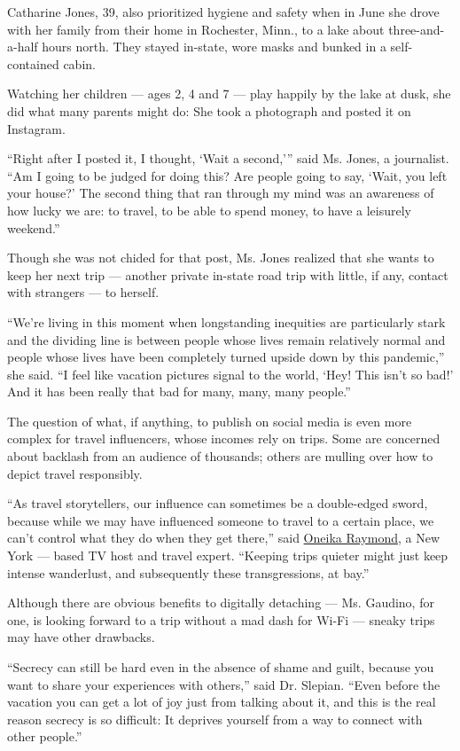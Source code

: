 Catharine Jones, 39, also prioritized hygiene and safety when in June
she drove with her family from their home in Rochester, Minn., to a lake
about three-and-a-half hours north. They stayed in-state, wore masks and
bunked in a self-contained cabin.

Watching her children --- ages 2, 4 and 7 --- play happily by the lake
at dusk, she did what many parents might do: She took a photograph and
posted it on Instagram.

``Right after I posted it, I thought, `Wait a second,''' said Ms. Jones,
a journalist. ``Am I going to be judged for doing this? Are people going
to say, `Wait, you left your house?' The second thing that ran through
my mind was an awareness of how lucky we are: to travel, to be able to
spend money, to have a leisurely weekend.''

Though she was not chided for that post, Ms. Jones realized that she
wants to keep her next trip --- another private in-state road trip with
little, if any, contact with strangers --- to herself.

``We're living in this moment when longstanding inequities are
particularly stark and the dividing line is between people whose lives
remain relatively normal and people whose lives have been completely
turned upside down by this pandemic,'' she said. ``I feel like vacation
pictures signal to the world, `Hey! This isn't so bad!' And it has been
really that bad for many, many, many people.''

The question of what, if anything, to publish on social media is even
more complex for travel influencers, whose incomes rely on trips. Some
are concerned about backlash from an audience of thousands; others are
mulling over how to depict travel responsibly.

``As travel storytellers, our influence can sometimes be a double-edged
sword, because while we may have influenced someone to travel to a
certain place, we can't control what they do when they get there,'' said
\href{http://www.oneikaraymond.com}{Oneika Raymond}, a New York ---
based TV host and travel expert. ``Keeping trips quieter might just keep
intense wanderlust, and subsequently these transgressions, at bay.''

Although there are obvious benefits to digitally detaching --- Ms.
Gaudino, for one, is looking forward to a trip without a mad dash for
Wi-Fi --- sneaky trips may have other drawbacks.

``Secrecy can still be hard even in the absence of shame and guilt,
because you want to share your experiences with others,'' said Dr.
Slepian. ``Even before the vacation you can get a lot of joy just from
talking about it, and this is the real reason secrecy is so difficult:
It deprives yourself from a way to connect with other people.''

